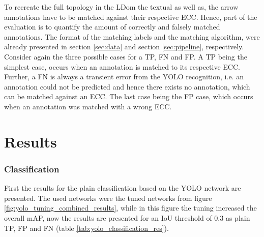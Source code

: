 To recreate the full topology in the \ac{LDom} the textual as well as, the arrow annotations have to be matched against their respective \ac{ECC}.
Hence, part of the evaluation is to quantify the amount of correctly and falsely matched annotations.
The format of the matching labels and the matching algorithm, were already presented in section \ref{sec:data} and section \ref{sec:pipeline}, respectively.
Consider again the three possible cases for a \ac{TP}, \ac{FN} and \ac{FP}.
A \ac{TP} being the simplest case, occurs when an annotation is matched to its respective \ac{ECC}.
Further, a \ac{FN} is always a transient error from the YOLO recognition, i.e. an annotation could not be predicted and hence there exists no annotation, which can be matched against an \ac{ECC}.
The last case being the \ac{FP} case, which occurs when an annotation was matched with a wrong \ac{ECC}.

\section{Results}

\subsubsection{Classification}
First the results for the plain classification based on the \ac{YOLO} network are presented.
The used networks were the tuned networks from figure \ref{fig:yolo_tuning_combined_results}, while in this figure the tuning increased the overall \ac{mAP}, now the results are presented for an \ac{IoU} threshold of 0.3 as plain \ac{TP}, \ac{FP} and \ac{FN} (table \ref{tab:yolo_classification_res}).

